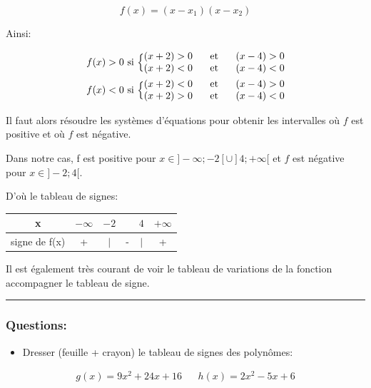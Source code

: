 \documentclass[11pt, french]{article}
\begin{document}
\begin{equation*}
    f(x) = (x-x_1)(x-x_2)
\end{equation*}

Ainsi:

\begin{align*}
f(x) > 0 \text{ si } \Big\{
\begin{matrix}
(x+2) > 0 \text{\hspace{0.5cm} et \hspace{0.5cm}} (x - 4) > 0 \\
(x+2) < 0 \text{\hspace{0.5cm} et \hspace{0.5cm}} (x - 4) < 0
\end{matrix} \\
f(x) < 0 \text{ si } \Big\{
\begin{matrix}
(x+2) < 0 \text{\hspace{0.5cm} et \hspace{0.5cm}} (x - 4) > 0 \\
(x+2) > 0 \text{\hspace{0.5cm} et \hspace{0.5cm}} (x - 4) < 0
\end{matrix}
\end{align*}

Il faut alors résoudre les systèmes d'équations pour obtenir les intervalles où $f$ est positive et où $f$ est négative.

Dans notre cas, f est positive pour $x\in ]-\infty;-2[\cup]4;+\infty[$ et $f$ est négative pour $x\in ]-2;4[$.

D'où le tableau de signes:
\begin{table}[!h]
    \centering
    \begin{tabular}{|c | c c c c c|}
        \hline
        x             &  $-\infty$ & $-2$ &   & $4$ & $+\infty$ \\\hline
        signe de f(x) &    +       &        $|$     & - &       $|$     &   +      \\\hline     
    \end{tabular}
\end{table}

Il est également très courant de voir le tableau de variations de la fonction accompagner le tableau de signe. 

\noindent\rule{\textwidth}{1pt}

\subsubsection*{Questions:}
\begin{itemize}
    \item Dresser (feuille + crayon) le tableau de signes des polynômes:
\end{itemize}
\begin{equation*}
    \begin{matrix}
    g(x) = 9x^2+24x+16 & & h(x) = 2x^2-5x+6
    \end{matrix}
\end{equation*}
\end{document}
